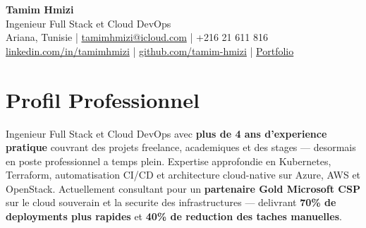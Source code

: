 \documentclass[10pt, letterpaper]{article}
\begin{document}
{\fontsize{22}{22}\selectfont \textbf{Tamim Hmizi}} \\[4pt]
{\large Ingenieur Full Stack et Cloud DevOps} \\[6pt]
Ariana, Tunisie \;|\;
\href{mailto:tamimhmizi@icloud.com}{tamimhmizi@icloud.com} \;|\;
+216 21 611 816 \\
\href{https://linkedin.com/in/tamimhmizi}{linkedin.com/in/tamimhmizi} \;|\;
\href{https://github.com/tamim-hmizi}{github.com/tamim-hmizi} \;|\;
\href{https://tamim-hmizi.github.io/Portfolio/}{Portfolio}

\vspace{0.4cm}

\section{Profil Professionnel}
Ingenieur Full Stack et Cloud DevOps avec \textbf{plus de 4 ans d'experience pratique} couvrant des projets freelance, academiques et des stages --- desormais en poste professionnel a temps plein.
Expertise approfondie en Kubernetes, Terraform, automatisation CI/CD et architecture cloud-native sur Azure, AWS et OpenStack.
Actuellement consultant pour un \textbf{partenaire Gold Microsoft CSP} sur le cloud souverain et la securite des infrastructures --- delivrant \textbf{70\% de deployments plus rapides} et \textbf{40\% de reduction des taches manuelles}.

\end{document}
